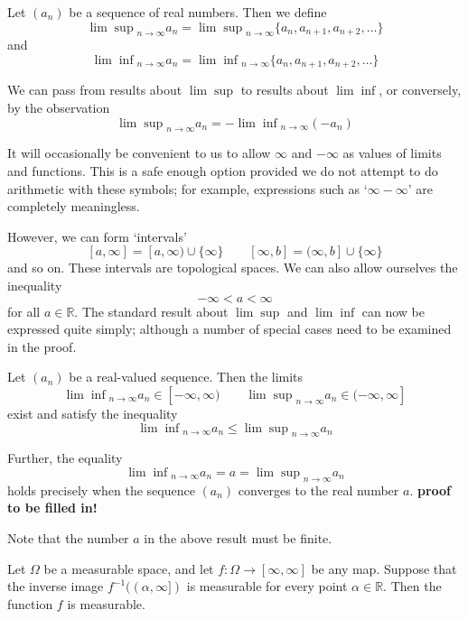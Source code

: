 
\begin{definition}
Let $(a_n)$ be a sequence of real numbers.  Then we define
$${\lim \sup}_{n\rightarrow \infty} a_n = {\lim \sup}_{n\rightarrow \infty} \{ a_n , a_{n+1} , a_{n+2} , \ldots \}$$
and
$${\lim \inf}_{n\rightarrow \infty} a_n = {\lim \inf}_{n\rightarrow \infty} \{ a_n , a_{n+1} , a_{n+2} , \ldots \}$$
\end{definition}

We can pass from results about $\lim \sup$ to results about $\lim \inf$, or conversely, by the observation
$${\lim \sup}_{n\rightarrow \infty} a_n = - {\lim \inf}_{n\rightarrow \infty} (-a_n)$$

It will occasionally be convenient to us to allow $\infty$ and $-\infty$ as values of limits and functions.  This is a safe enough option provided we do not attempt to do arithmetic with these symbols; for example, expressions such as `$\infty - \infty$' are completely meaningless.

However, we can form `intervals'
$$[a,\infty ] = [a ,\infty )\cup \{ \infty \}  \qquad [\infty ,b] = (\infty ,b]\cup \{ \infty \}$$
and so on.  These intervals are topological spaces.  We can also allow ourselves the inequality
$$-\infty < a < \infty$$
for all $a\in {\mathbb R}$.  The standard result about $\lim \sup$ and $\lim \inf$ can now be expressed quite simply; although a number of special cases need to be examined in the proof.

\begin{theorem}
Let $(a_n)$ be a real-valued sequence.  Then the limits
$${\lim \inf}_{n\rightarrow \infty} a_n \in [-\infty , \infty ) \qquad {\lim \sup}_{n\rightarrow \infty} a_n \in (-\infty , \infty ]$$
exist and satisfy the inequality
$${\lim \inf}_{n\rightarrow \infty} a_n \leq {\lim \sup}_{n\rightarrow \infty} a_n$$

Further, the equality
$${\lim \inf}_{n\rightarrow \infty} a_n = a = {\lim \sup}_{n\rightarrow \infty} a_n$$
holds precisely when the sequence $(a_n)$ converges to the real number $a$.
\textbf{proof to be filled in!}
\end{theorem}

Note that the number $a$ in the above result must be finite.

\begin{proposition}
Let $\Omega$ be a measurable space, and let $f\colon \Omega \rightarrow [\infty , \infty]$ be any map.  Suppose that the inverse image $f^{-1}((\alpha , \infty ])$ is measurable for every point $\alpha \in {\mathbb R}$.  Then the function $f$ is measurable.
\end{proposition}


